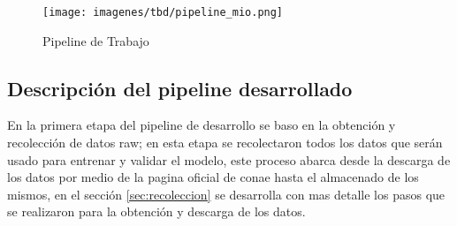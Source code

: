 \begin{figure}[H] \centering
  \texttt{[image: imagenes/tbd/pipeline\_mio.png]}
  \caption{Pipeline de Trabajo}\label{Fig:pipeline-mio}
\end{figure}

\newpage
\subsection{Descripción del pipeline desarrollado}\label{sub:desc-pipeline}

En la primera etapa del pipeline de desarrollo se baso en la obtención y recolección de datos raw; en esta etapa se recolectaron todos los datos que serán usado para entrenar y validar el modelo, este proceso abarca desde la descarga de los datos por medio de la pagina oficial de \ac{conae} hasta el almacenado de los mismos, en el sección \ref{sec:recoleccion} se desarrolla con mas detalle los pasos que se realizaron para la obtención y descarga de los datos.



